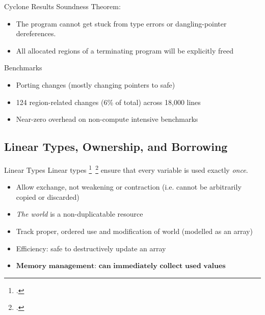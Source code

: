 \documentclass[aspectratio=169]{beamer}
\begin{document}
\begin{frame}{Cyclone Results}
Soundness Theorem:
    \begin{itemize}
        \item The program cannot get stuck from type errors or dangling-pointer dereferences. 
        \item All allocated regions of a terminating program will be explicitly freed 
    \end{itemize}
\pause
Benchmarks
    \begin{itemize}
        \item Porting changes (mostly changing pointers to safe) %
        \item 124 region-related changes (6\% of total) across 18,000 lines
        \item Near-zero overhead on non-compute intensive benchmarks %
    \end{itemize}
\end{frame}


\subsection{Linear Types, Ownership, and Borrowing}

\begin{frame}{Linear Types}
    Linear types \footcite{girard_linear_1987}\ \footcite{wadler_linear_1990} ensure that every variable is used exactly \emph{once}.
    \begin{itemize}
        \item Allow exchange, not weakening or contraction (i.e. cannot be arbitrarily copied or discarded)
        \item \emph{The world} is a non-duplicatable resource %
        \item Track proper, ordered use and modification of world (modelled as an array)
        \item Efficiency: safe to destructively update an array
        \item $\textbf{Memory management: can immediately collect used values}$ %
    \end{itemize}
\end{frame}
\end{document}
